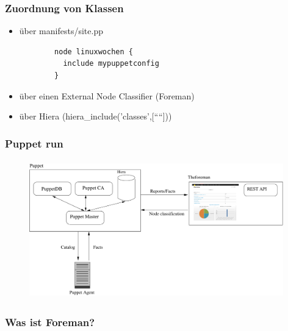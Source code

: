 \documentclass{beamer}
\begin{document}
\begin{frame}[fragile]
  \frametitle{Zuordnung von Klassen}

  \begin{itemize}
    \item über manifests/site.pp
      \begin{lstlisting}
        node linuxwochen {
          include mypuppetconfig
        }
      \end{lstlisting}
  \item über einen External Node Classifier (Foreman)
  \item über Hiera (hiera\_include('classes',[````]))
  \end{itemize}
\end{frame}


\begin{frame}
  \frametitle{Puppet run}
  \begin{figure}[ht]
    \centering
      \includegraphics[height=6cm,width=11cm]{../pics/puppet_overview}
    \label{fig:stack}
  \end{figure}
\end{frame}

\begin{frame}
  \frametitle{Was ist Foreman?}
  \begin{figure}[ht]
    \centering
    \label{fig:stack}
  \end{figure}
\end{frame}
\end{document}
